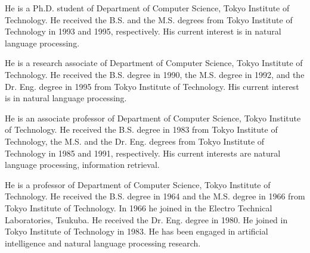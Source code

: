 


\begin{biography}

\biotitle{}

 { He is a Ph.D. student of Department of
  Computer Science, Tokyo Institute of Technology. He received the
  B.S.  and the M.S. degrees from Tokyo Institute of Technology in
  1993 and 1995, respectively. His current interest is in natural
  language processing.  }

 { He is a research associate of Department of
  Computer Science, Tokyo Institute of Technology. He received the
  B.S.  degree in 1990, the M.S. degree in 1992, and the Dr. Eng. 
  degree in 1995 from Tokyo Institute of Technology. His current
  interest is in natural language processing.  }

 { He is an associate professor of
  Department of Computer Science, Tokyo Institute of Technology. He
  received the B.S.  degree in 1983 from Tokyo Institute of
  Technology, the M.S. and the Dr. Eng. degrees from Tokyo Institute
  of Technology in 1985 and 1991, respectively. His current interests
  are natural language processing, information retrieval.  }

 { He is a professor of Department of
  Computer Science, Tokyo Institute of Technology. He received the
  B.S. degree in 1964 and the M.S. degree in 1966 from Tokyo Institute
  of Technology. In 1966 he joined in the Electro Technical
  Laboratories, Tsukuba. He received the Dr. Eng. degree in 1980. He
  joined in Tokyo Institute of Technology in 1983. He has been engaged
  in artificial intelligence and natural language processing research.
  }



\end{biography}


